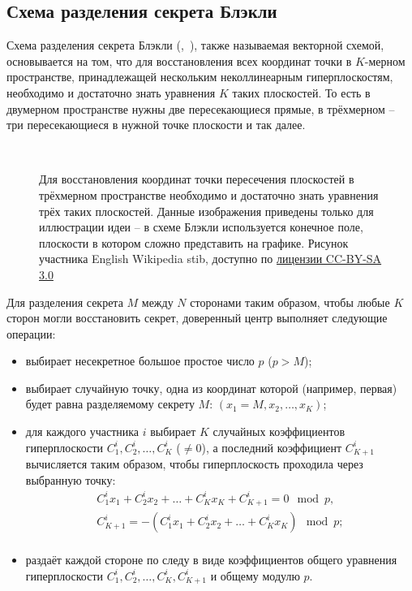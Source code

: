 \subsection[Схема Блэкли]{Схема разделения секрета Блэкли}

Схема разделения секрета Блэкли (,~\cite{Blackley:1979}), также называемая векторной схемой, основывается на том, что для восстановления всех координат точки в $K$-мерном пространстве, принадлежащей нескольким неколлинеарным гиперплоскостям, необходимо и достаточно знать уравнения $K$ таких плоскостей. То есть в двумерном пространстве нужны две пересекающиеся прямые, в трёхмерном -- три пересекающиеся в нужной точке плоскости и так далее.

\begin{figure}[thb]
	\centering
	~~~~
	\caption{Для восстановления координат точки пересечения плоскостей в трёхмерном пространстве необходимо и достаточно знать уравнения трёх таких плоскостей. Данные изображения приведены только для иллюстрации идеи -- в схеме Блэкли используется конечное поле, плоскости в котором сложно представить на графике. Рисунок участника English Wikipedia stib, доступно по \href{https://creativecommons.org/licenses/by-sa/3.0/deed.ru}{лицензии CC-BY-SA 3.0}}
\end{figure}

Для разделения секрета $M$ между $N$ сторонами таким образом, чтобы любые $K$ сторон могли восстановить секрет, доверенный центр выполняет следующие операции:
\begin{itemize}
	\item выбирает несекретное большое простое число $p$ ($p > M$);
	\item выбирает случайную точку, одна из координат которой (например, первая) будет равна разделяемому секрету $M$: $(x_1 = M, x_2, \dots, x_K)$;
	\item для каждого участника $i$ выбирает $K$ случайных коэффициентов гиперплоскости $C^i_1, C^i_2, \dots, C^i_{K}$ ($\ne 0$), а последний коэффициент $C^i_{K+1}$ вычисляется таким образом, чтобы гиперплоскость проходила через выбранную точку:
		\[ \begin{array}{l}
			C^i_1 x_1 + C^i_2 x_2 + \dots + C^i_K x_K + C^i_{K+1} = 0 \mod p, \\
			C^i_{K+1} = - ( C^i_1 x_1 + C^i_2 x_2 + \dots + C^i_K x_K ) \mod p; \\
		\end{array} \]
	\item раздаёт каждой стороне по следу в виде коэффициентов общего уравнения гиперплоскости $C^i_1, C^i_2, \dots, C^i_{K}, C^i_{K+1}$ и общему модулю $p$.
\end{itemize}

